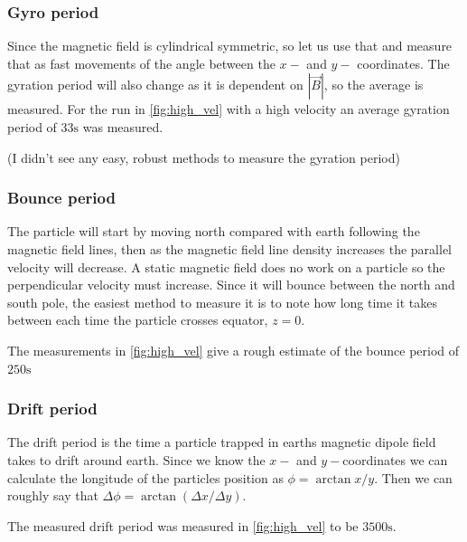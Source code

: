 \documentclass[x11names]{article}
\renewcommand{\va}{\vec}
\begin{document}
    \subsubsection{Gyro period}
    Since the magnetic field is cylindrical symmetric, so let us use that and measure that as fast movements of the angle between the \(x-\) and \(y-\) coordinates. The gyration period will also change as it is dependent on \(|\va{B}|\), so the average is measured. For the run in \cref{fig:high_vel} with a high velocity an average gyration period of \( 33 \si{\second}\) was measured.

    (I didn't see any easy, robust methods to measure the gyration period)


    \subsubsection{Bounce period}
    The particle will start by moving north compared with earth following the magnetic field lines, then as the magnetic field line density increases the parallel velocity will decrease. A static magnetic field does no work on a particle so the perpendicular velocity must increase. Since it will bounce between the north and south pole, the easiest method to measure it is to note how long time it takes between each time the particle crosses equator, \(z = 0\).

    The measurements in \cref{fig:high_vel} give a rough estimate of the bounce period of \( 250 \si{\second}\)

    \subsubsection{Drift period}
    The drift period is the time a particle trapped in earths magnetic dipole field takes to drift around earth. Since we know the \(x-\) and \(y-\)coordinates we can calculate the longitude of the particles position as \( \phi = \arctan{x/y} \). Then we can roughly say that \(\Delta \phi = \arctan(\Delta x / \Delta y) \).

    The measured drift period was measured in \cref{fig:high_vel} to be \(3500 \si{\second}\).


\appendix
\end{document}
